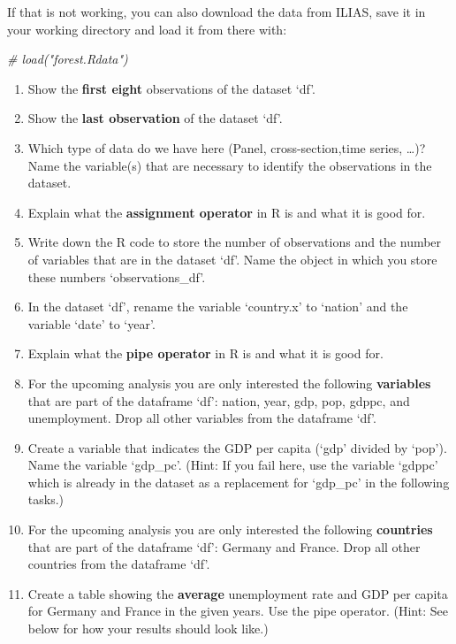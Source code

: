 \documentclass[
  12pt,
  oneside]{book}
\newenvironment{Shaded}{\begin{snugshade}}{\end{snugshade}}
\newcommand{\CommentTok}[1]{\textcolor[rgb]{0.56,0.35,0.01}{\textit{#1}}}
\begin{document}
If that is not working, you can also download the data from ILIAS, save it in
your working directory and load it from there with:

\begin{Shaded}
\begin{Highlighting}[]
\CommentTok{\# load("forest.Rdata")}
\end{Highlighting}
\end{Shaded}

\begin{enumerate}
\def\labelenumi{(\arabic{enumi})}
\setcounter{enumi}{4}
\item
  Show the \textbf{first eight} observations of the dataset `df'.
\item
  Show the \textbf{last observation} of the dataset `df'.
\item
  Which type of data do we have here (Panel, cross-section,time series, \ldots)?
  Name the variable(s) that are necessary to identify the observations in the dataset.
\item
  Explain what the \textbf{assignment operator} in R is and what it is good for.
\item
  Write down the R code to store the number of observations and the number of variables
  that are in the dataset `df'. Name the object in which you store these numbers `observations\_df'.
\item
  In the dataset `df', rename the variable `country.x' to `nation' and the variable `date' to `year'.
\item
  Explain what the \textbf{pipe operator} in R is and what it is good for.
\item
  For the upcoming analysis you are only interested the following \textbf{variables} that are part of the dataframe `df': nation, year, gdp, pop, gdppc, and unemployment. Drop all other variables from the dataframe `df'.
\item
  Create a variable that indicates the GDP per capita (`gdp' divided by `pop').
  Name the variable `gdp\_pc'. (Hint: If you fail here, use the variable `gdppc' which is
  already in the dataset as a replacement for `gdp\_pc' in the following tasks.)
\item
  For the upcoming analysis you are only interested the following \textbf{countries}
  that are part of the dataframe `df': Germany and France. Drop all other
  countries from the dataframe `df'.
\item
  Create a table showing the \textbf{average} unemployment rate and GDP per capita for Germany
  and France in the given years. Use the pipe operator. (Hint: See below for how your results should
  look like.)
\end{enumerate}
\end{document}
